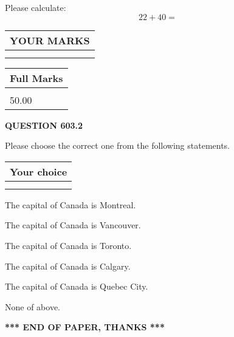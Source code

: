 \documentclass[12pt]{article}
\begin{document}
  
 
Please calculate:
\begin{equation}
22 +  %
40 = \nonumber
\end{equation}
 

 

 
  
\vspace{0.2in}
  
\noindent\begin{tabular}{|l|}
\hline
 YOUR MARKS  \\
\hline
 \\ 
 \\ 
\hline
\end{tabular}
\hspace{0.05in} \begin{tabular}{|l|}
\hline
 Full Marks  \\
\hline
 \\ 
50.00 \\
\hline
\end{tabular}
{\textbf{\Large{QUESTION
603.2 
}}}
  
  
Please choose the correct one from the following statements.
  
  
\noindent\hspace{3.0in} \begin{tabular}{|l|}
\hline
Your choice \\
\hline
 \\ 
 \\ 
\hline
\end{tabular}
  
  
 
 
The capital of Canada is Montreal.
 
 
The capital of Canada is Vancouver.
 
 
The capital of Canada is Toronto.
 
 
The capital of Canada is Calgary.
 
 
The capital of Canada is Quebec City.
 
 
 None of above.
 
 
   
   
 \vspace{0.2in}
 
   
   
   
   
\vspace{1.0in} 
{\textbf{\large{ *** END OF PAPER, THANKS *** }}} 
   
\end{document}
